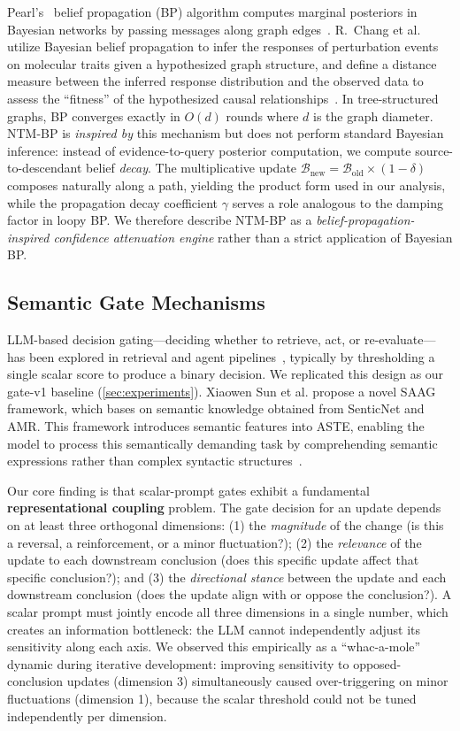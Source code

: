 \documentclass{article}
\theoremstyle{definition}
\begin{document}
Pearl's~\cite{pearl1988} belief propagation (BP) algorithm computes
marginal posteriors in Bayesian networks by passing messages along
graph edges~\cite{koller2009probabilistic}. R.~Chang et al. utilize
Bayesian belief propagation to infer the responses of perturbation
events on molecular traits given a hypothesized graph structure, and
define a distance measure between the inferred response distribution and
the observed data to assess the ``fitness'' of the hypothesized causal
relationships~\cite{rui2015causal}. In tree-structured graphs, BP converges exactly in
$O(d)$ rounds where $d$ is the graph diameter. NTM-BP is
\emph{inspired by} this mechanism but does not perform standard Bayesian
inference: instead of evidence-to-query posterior computation, we compute
source-to-descendant belief \emph{decay}. The multiplicative update
$\mathcal{B}_{\text{new}} = \mathcal{B}_{\text{old}} \times (1 - \delta)$
composes naturally along a path, yielding the product form used in our
analysis, while the
propagation decay coefficient $\gamma$ serves a role analogous to the
damping factor in loopy BP. We therefore describe NTM-BP as a
\emph{belief-propagation-inspired confidence attenuation engine} rather
than a strict application of Bayesian BP.

\subsection{Semantic Gate Mechanisms}

LLM-based decision gating---deciding whether to retrieve, act, or
re-evaluate---has been explored in retrieval and agent
pipelines~\cite{rag2020,react2023,retroformer2023}, typically by
thresholding a single scalar score to produce a binary decision. We
replicated this design as our gate-v1 baseline
(\cref{sec:experiments}). Xiaowen Sun et al. propose a novel SAAG
framework, which bases on semantic knowledge obtained from SenticNet and
AMR. This framework introduces semantic features into ASTE, enabling the
model to process this semantically demanding task by comprehending
semantic expressions rather than complex syntactic
structures~\cite{sun2025senticnet}.

Our core finding is that scalar-prompt gates exhibit a fundamental
\textbf{representational coupling} problem. The gate decision for an
update depends on at least three orthogonal dimensions: (1) the
\emph{magnitude} of the change (is this a reversal, a reinforcement, or
a minor fluctuation?); (2) the \emph{relevance} of the update to each
downstream conclusion (does this specific update affect that specific
conclusion?); and (3) the \emph{directional stance} between the update
and each downstream conclusion (does the update align with or oppose
the conclusion?). A scalar prompt must jointly encode all three
dimensions in a single number, which creates an information bottleneck:
the LLM cannot independently adjust its sensitivity along each axis.
We observed this empirically as a ``whac-a-mole'' dynamic during
iterative development: improving sensitivity
to opposed-conclusion updates (dimension 3) simultaneously caused
over-triggering on minor fluctuations (dimension 1), because the scalar
threshold could not be tuned independently per dimension.
\end{document}
